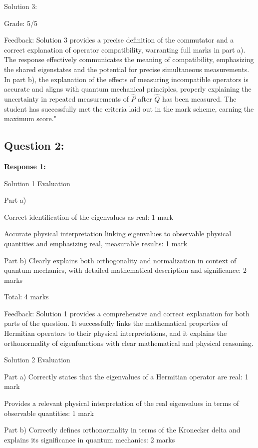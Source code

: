 \documentclass[a4paper,11pt]{article}
\begin{document}
Solution 3:

Grade: 5/5

Feedback: Solution 3 provides a precise definition of the commutator and a correct explanation of operator compatibility, warranting full marks in part a). The response effectively communicates the meaning of compatibility, emphasizing the shared eigenstates and the potential for precise simultaneous measurements. In part b), the explanation of the effects of measuring incompatible operators is accurate and aligns with quantum mechanical principles, properly explaining the uncertainty in repeated measurements of \(\hat{P}\) after \(\hat{Q}\) has been measured. The student has successfully met the criteria laid out in the mark scheme, earning the maximum score."

\subsection*{Question 2:}

\textbf{Response 1:}

Solution 1 Evaluation

Part a)

Correct identification of the eigenvalues as real: 1 mark

Accurate physical interpretation linking eigenvalues to observable physical quantities and emphasizing real, measurable results: 1 mark

Part b)
Clearly explains both orthogonality and normalization in context of quantum mechanics, with detailed mathematical description and significance: 2 marks

Total: 4 marks

Feedback: Solution 1 provides a comprehensive and correct explanation for both parts of the question. It successfully links the mathematical properties of Hermitian operators to their physical interpretations, and it explains the orthonormality of eigenfunctions with clear mathematical and physical reasoning.

Solution 2 Evaluation

Part a)
Correctly states that the eigenvalues of a Hermitian operator are real: 1 mark

Provides a relevant physical interpretation of the real eigenvalues in terms of observable quantities: 1 mark

Part b)
Correctly defines orthonormality in terms of the Kronecker delta and explains its significance in quantum mechanics: 2 marks
\end{document}
